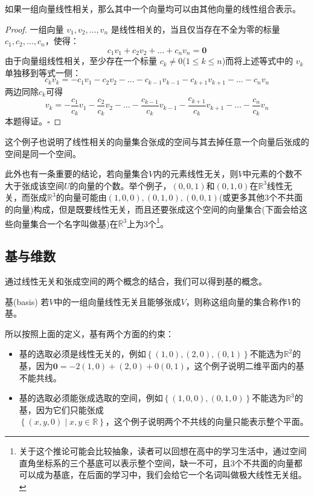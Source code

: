 \begin{corollary}
	如果一组向量线性相关，那么其中一个向量均可以由其他向量的线性组合表示。
\end{corollary}

\begin{proof}
	一组向量 $v_1, v_2, \dots, v_n$ 是线性相关的，当且仅当存在不全为零的标量 $c_1, c_2, \dots, c_n$，使得：$$c_1 v_1 + c_2 v_2 + \dots + c_n v_n = \mathbf{0}$$由于向量组线性相关，至少存在一个标量 $c_k \neq 0$($1 \leq k \leq n$)而将上述等式中的 $v_k$ 单独移到等式一侧：$$c_k v_k = -c_1 v_1 - c_2 v_2 - \dots - c_{k-1} v_{k-1} - c_{k+1} v_{k+1} - \dots - c_n v_n$$两边同除$c_k$可得$$v_k = -\frac{c_1}{c_k} v_1 - \frac{c_2}{c_k} v_2 - \dots - \frac{c_{k-1}}{c_k} v_{k-1} - \frac{c_{k+1}}{c_k} v_{k+1} - \dots - \frac{c_n}{c_k} v_n$$本题得证。$\square$
\end{proof}

这个例子也说明了线性相关的向量集合张成的空间与其去掉任意一个向量后张成的空间是同一个空间。

此外也有一条重要的结论，若向量集合$V$内的元素线性无关，则$V$中元素的个数不大于张成该空间$U$的向量的个数。举个例子，$\left( 0,0,1 \right)$和$(0,1,0)$在$\mathbb{R}^3$线性无关，而张成$\mathbb{R}^3$的向量可能由$(1,0,0),(0,1,0),(0,0,1)$(或更多其他3个不共面的向量)构成，但是既要线性无关，而且还要张成这个空间的向量集合(下面会给这些向量集合一个名字叫做基)在$\mathbb{R}^3$上为3个\footnote{关于这个推论可能会比较抽象，读者可以回想在高中的学习生活中，通过空间直角坐标系的三个基底可以表示整个空间，缺一不可，且3个不共面的向量都可以成为基底，在后面的学习中，我们会给它一个名词叫做极大线性无关组。}。

\subsection{基与维数}

通过线性无关和张成空间的两个概念的结合，我们可以得到基的概念。

\begin{definition}{基(basis)}
	若$V$中的一组向量线性无关且能够张成$V$，则称这组向量的集合称作$V$的基。
\end{definition}

所以按照上面的定义，基有两个方面的约束：
\begin{itemize}
	\item 基的选取必须是线性无关的，例如$\left\{ (1,0),(2,0),(0,1) \right\}$不能选为$\mathbb{R}^2$的基，因为$\boldsymbol{0}=-2(1,0)+(2,0)+0(0,1)$，这个例子说明二维平面内的基不能共线。
	\item 基的选取必须能张成选取的空间，例如$\left\{ (1,0,0),(0,1,0) \right\}$不能选为$\mathbb{R}^3$的基，因为它们只能张成\\$\left\{ (x,y,0)\mid x,y \in \mathbb{R} \right\}$，这个例子说明两个不共线的向量只能表示整个平面。
\end{itemize}

